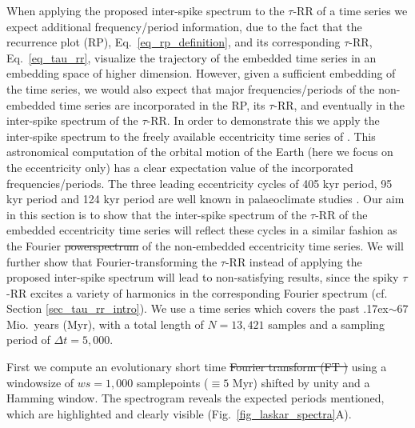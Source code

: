 \documentclass[entropy,article,submit,pdftex,moreauthors]{Definitions/mdpi}
\newcommand{\mytilde}{\raise.17ex\hbox{$\scriptstyle\mathtt{\sim}$}}
\providecommand{\DIFadd}[1]{{\protect\color{blue}\uwave{#1}}} %
\providecommand{\DIFdel}[1]{{\protect\color{red}\sout{#1}}}                      %
\providecommand{\DIFaddbegin}{} %
\providecommand{\DIFaddend}{} %
\providecommand{\DIFdelbegin}{} %
\providecommand{\DIFdelend}{} %
\begin{document}
When applying the proposed inter-spike spectrum to the $\tau$-RR of a time series we expect additional frequency/period information, due to the fact that the recurrence plot (RP), 
Eq.~\eqref{eq_rp_definition}, and its corresponding $\tau$-RR, Eq.~\eqref{eq_tau_rr}, visualize the trajectory of the embedded time series in an embedding space of higher dimension. 
However, given a sufficient embedding of the time series, we would also expect that major frequencies/periods of the non-embedded time series are incorporated in the RP, its $\tau$-RR, 
and eventually in the inter-spike spectrum of the $\tau$-RR. In order to demonstrate this we apply the inter-spike spectrum to the freely available eccentricity time series of \citet{Laskar2011}. 
This astronomical computation of the orbital motion of the Earth (here we focus on the eccentricity only) has a clear expectation value of the incorporated frequencies/periods. The three leading 
eccentricity cycles of 405 kyr period, 95 kyr period and 124 kyr period are well known in palaeoclimate studies \cite{Laskar2004,Westerhold2020}. Our aim in this section is to show that the inter-spike spectrum 
of the $\tau$-RR of the embedded eccentricity time series will reflect these cycles in a similar fashion as the Fourier \DIFdelbegin \DIFdel{powerspectrum }\DIFdelend \DIFaddbegin \DIFadd{power spectral density }\DIFaddend of the non-embedded eccentricity time series. We will further 
show that Fourier-transforming the $\tau$-RR instead of applying the proposed inter-spike spectrum will lead to non-satisfying results, since the spiky $\tau$-RR excites a variety of harmonics in 
the corresponding Fourier spectrum (cf. Section \ref{sec_tau_rr_intro}). We use a time series which covers the past \mytilde $67$ Mio.~years (Myr), with a total length of $N=13,421$ samples and a 
sampling period of $\Delta t= 5,000$.
\DIFdelbegin %
\DIFdelend \DIFaddbegin 

\DIFaddend First we compute an evolutionary short time \DIFdelbegin \DIFdel{Fourier transform (FT ) }\DIFdelend \DIFaddbegin \DIFadd{FT }\DIFaddend using a windowsize of $ws=1,000$ samplepoints ($\equiv 5$ Myr) shifted by unity and a 
Hamming window. The spectrogram reveals the expected periods mentioned, which are highlighted and clearly visible (Fig.~\ref{fig_laskar_spectra}A). 
\end{document}
